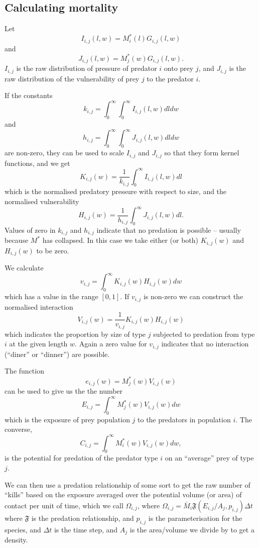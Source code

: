 \subsection{Calculating mortality}

Let
\[ I_{i,j} (l, w) = M^{\ast}_i (l) G_{i,j} (l, w) \]
and
\[ J_{i,j} (l, w) = M^{\ast}_j (w) G_{i,j} (l, w) . \]
$I_{i,j}$ is the raw distribution of pressure of predator $i$ onto prey $j$,
and $J_{i,j}$ is the raw distribution of the vulnerability of prey $j$ to the
predator $i$.

If the constants
\[ k_{i,j} = \int_0^{\infty} \int_0^{\infty} I_{i,j} (l, w) dl dw \]
and
\[ h_{i,j} = \int_0^{\infty} \int_0^{\infty} J_{i,j} (l, w) dl dw \]
are non-zero, they can be used to scale $I_{i,j}$ and $J_{i,j}$ so that they
form kernel functions, and we get
\[ K_{i,j} (w) = \frac{1}{k_{i,j}} \int_0^{\infty} I_{i,j} (l, w) dl \]
which is the normalised predatory pressure with respect to size, and the
normalised vulnerability
\[ H_{i,j} (w) = \frac{1}{h_{i,j}} \int_0^{\infty} J_{i,j} (l, w) dl . \]
Values of zero in $k_{i,j}$ and $h_{i,j}$ indicate that no predation is
possible -- usually because $M^{\ast}$ has collapsed. In this case we take
either (or both) $K_{i,j} (w)$ and $H_{i,j} (w)$ to be zero.

We calculate
\[ v_{i,j} = \int_0^{\infty} K_{i,j} (w) H_{i,j} (w) dw \]
which has a value in the range $[0, 1]$. If $v_{i,j}$ is non-zero we can
construct the normalised interaction
\[ V_{i,j} (w) = \frac{1}{v_{i,j}} K_{i,j} (w) H_{i,j} (w) \]
which indicates the proportion by size of type $j$ subjected to predation from
type $i$ at the given length $w$. Again a zero value for $v_{i,j}$ indicates
that no interaction (``diner'' or ``dinner'') are possible.



The function
\[ e_{i,j} (w) = M^{\ast}_j (w) V_{i,j} (w)  \]
can be used to give us the the number
\[ E_{i,j} = \int_0^{\infty} M^{\ast}_j (w) V_{i,j} (w) d w \]
which is the exposure of prey population $j$ to the predators in
population $i$. The converse,
\[ C_{i,j} = \int_0^{\infty} M_i^{\ast} (w) V_{i,j} (w) d w, \]
is the potential for predation of the predator type $i$ on an ``average'' prey
of type $j$.

We can then use a predation relationship of some sort to get the raw
number of ``kills'' based on the exposure averaged over the potential
volume (or area) of contact per unit of time, which we call $\Omega_{i,j}$, where $\Omega_{i,j} = \bar{M}_i \mathfrak{F} (E_{i,j} / A_j,
p_{i,j}) \Delta t$ where $\mathfrak{F}$ is the predation relationship,
and $p_{i,j}$ is the parameterisation for the species, and $\Delta t$
is the time step, and $A_j$ is the area/volume we divide by to get a
density.

